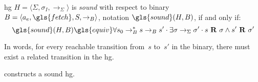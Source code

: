 \begin{definition}
  \Ac{hg} $H = \langle \Sigma, \sigma_I, \rightarrow_\Sigma\rangle$ is \emph{sound} with respect to binary $B = \langle a_e, \gls{fetch}, S, \rightarrow_B \rangle$, notation $\gls{sound}(H,B)$, if and only if:
  \begin{equation*}
    \gls{sound}(H,B) \gls{equiv} \forall s_0 \rightarrow_B^\ast s \rightarrow_B s' \sepdot \exists \sigma \rightarrow_\Sigma \sigma' \sepdot s~\mathbf{R}~\sigma \wedge s'~\mathbf{R}~\sigma'
  \end{equation*}
\end{definition}
In words, for every reachable transition from~$s$ to~$s'$ in the binary, there must exist a related transition in the \ac{hg}.

%
%
\begin{theorem}[Soundness]\label{thm:algo_soundness}
   constructs a sound \ac{hg}.
\end{theorem}
